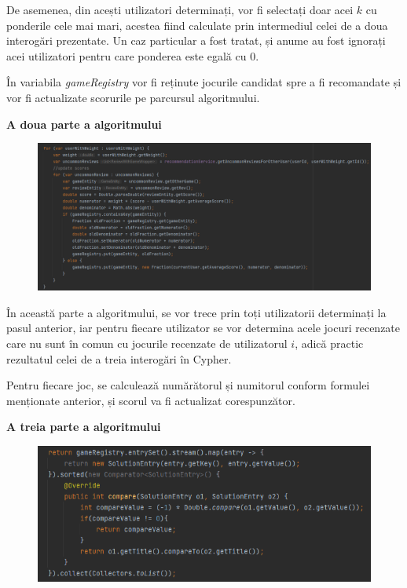 \documentclass[12pt,a4paper]{report}
\begin{document}
De asemenea, din acești utilizatori determinați, vor fi selectați doar acei \( k \) cu ponderile cele mai mari, acestea fiind calculate prin intermediul celei de a doua interogări prezentate. Un caz particular a fost tratat, și anume au fost ignorați acei utilizatori pentru care ponderea este egală cu \( 0 \).

În variabila \emph{gameRegistry} vor fi reținute jocurile candidat spre a fi recomandate și vor fi actualizate scorurile pe parcursul algoritmului.

\bigskip
\textbf{A doua parte a algoritmului}
\bigskip

\begin{figure}[H]
\centering
\caption{}
\includegraphics[scale = 0.6]{exemplu_28_second_part}
\caption*{}
\end{figure}

În această parte a algoritmului, se vor trece prin toți utilizatorii determinați la pasul anterior, iar pentru fiecare utilizator se vor determina acele jocuri recenzate care nu sunt în comun cu jocurile recenzate de utilizatorul \( i \), adică practic rezultatul celei de a treia interogări în Cypher.

Pentru fiecare joc, se calculează numărătorul și numitorul conform formulei menționate anterior, și scorul va fi actualizat corespunzător.

\newpage

\bigskip
\textbf{A treia parte a algoritmului}
\bigskip

\begin{figure}[H]
\centering
\caption{}
\includegraphics[scale = 0.9]{exemplu_29_third_part}
\caption*{}
\end{figure}
\end{document}
